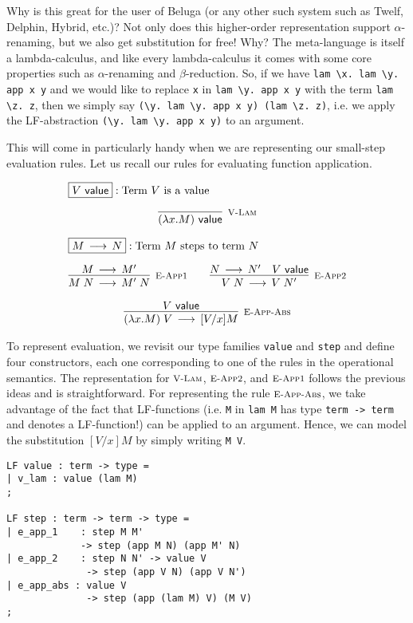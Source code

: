Why is this great for the user of Beluga (or any other such system such as Twelf, Delphin, Hybrid, etc.)? Not only does this higher-order representation support $\alpha$-renaming, but we also get substitution for free! Why?  The meta-language is itself a lambda-calculus, and like every lambda-calculus it comes with some core properties such as $\alpha$-renaming and $\beta$-reduction. So, if we
have \lstinline!lam \x. lam \y. app x y! and we would like to replace
\lstinline!x! in \lstinline!lam \y. app x y! with the term
\lstinline!lam \z. z!, then we simply say
\lstinline!(\y. lam \y. app x y) (lam \z. z)!, i.e. we apply the
LF-abstraction \lstinline!(\y. lam \y. app x y)! to an argument.

This will come in particularly handy when we are representing our small-step
evaluation rules. Let us recall our rules for evaluating function application.

\[
\begin{array}{c}
\multicolumn{1}{l}{\fbox{$V \Value$}: \mbox{Term $V$ is a value}}\\[1em]
\infer[\VLam]{(\lam x.M) \Value}{}
\\[1em]
\multicolumn{1}{l}{\fbox{$M \Steps N$}: \mbox{Term $M$ steps to term $N$}}
\\[1em]
\infer[\EAppFnStep]{M \app N \Steps M'\;N}{M \Steps M'} \qquad
\infer[\EAppArgStep]{V \app N \Steps V\;N'}{N \Steps N' & V \Value}
\\[1em]
\infer[\EAppBeta]{(\lam x.M) \app V \Steps [V/x]M}{V \Value}
\end{array}
\]

To represent evaluation, we revisit our type families \lstinline!value! and
\lstinline!step! and define four constructors, each one corresponding to one of
the rules in the operational semantics. The representation for $\textsc{\footnotesize V-Lam}$, $\textsc{\footnotesize E-App2}$,
and $\textsc{\footnotesize E-App1}$ follows the previous ideas and is straightforward. For
representing the rule $\textsc{\footnotesize E-App-Abs}$, we take advantage of the fact that
LF-functions (i.e. \lstinline!M! in \lstinline!lam M! has type
\lstinline!term -> term! and denotes a LF-function!) can be applied to an
argument. Hence, we can model the substitution $[V/x]M$ by simply writing
\lstinline!M V!.

\begin{lstlisting}
LF value : term -> type =
| v_lam : value (lam M)
;

LF step : term -> term -> type =
| e_app_1    : step M M'
             -> step (app M N) (app M' N)
| e_app_2    : step N N' -> value V
              -> step (app V N) (app V N')
| e_app_abs : value V
              -> step (app (lam M) V) (M V)
;
\end{lstlisting}

